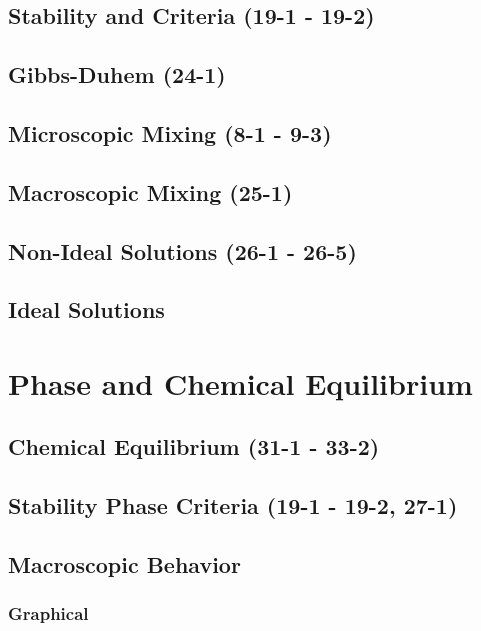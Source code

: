 \documentclass{mitqualif}
\begin{document}
\subsection{Stability and Criteria (19-1 - 19-2)}


\subsection{Gibbs-Duhem (24-1)}

\subsection{Microscopic Mixing (8-1 - 9-3)}





\subsection{Macroscopic Mixing (25-1)}

\subsection{Non-Ideal Solutions (26-1 - 26-5)}





\subsection{Ideal Solutions}
\section{Phase and Chemical Equilibrium}
\subsection{Chemical Equilibrium (31-1 - 33-2)}







\subsection{Stability Phase Criteria (19-1 - 19-2, 27-1)}



\subsection{Macroscopic Behavior}
\subsubsection{Graphical}
\end{document}
